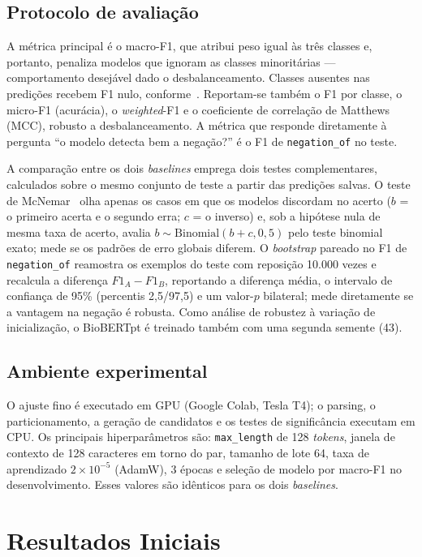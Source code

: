\documentclass[12pt]{article}
\begin{document}
\subsection{Protocolo de avaliação}
A métrica principal é o macro-F1, que atribui peso igual às três classes e,
portanto, penaliza modelos que ignoram as classes minoritárias --- comportamento
desejável dado o desbalanceamento. Classes ausentes nas predições recebem F1
nulo, conforme~\cite{forman:10}. Reportam-se também o F1 por classe, o micro-F1
(acurácia), o \emph{weighted}-F1 e o coeficiente de correlação de Matthews
(MCC), robusto a desbalanceamento. A métrica que responde diretamente à pergunta
``o modelo detecta bem a negação?'' é o F1 de \texttt{negation\_of} no teste.

A comparação entre os dois \emph{baselines} emprega dois testes complementares,
calculados sobre o mesmo conjunto de teste a partir das predições salvas. O teste
de McNemar~\cite{dietterich:98} olha apenas os casos em que os modelos discordam
no acerto ($b$ = o primeiro acerta e o segundo erra; $c$ = o inverso) e, sob a
hipótese nula de mesma taxa de acerto, avalia $b \sim \mathrm{Binomial}(b+c,
0{,}5)$ pelo teste binomial exato; mede se os padrões de erro globais diferem.
O \emph{bootstrap} pareado no F1 de \texttt{negation\_of} reamostra os exemplos
do teste com reposição 10.000 vezes e recalcula a diferença $F1_A - F1_B$,
reportando a diferença média, o intervalo de confiança de 95\% (percentis
2,5/97,5) e um valor-$p$ bilateral; mede diretamente se a vantagem na negação é
robusta. Como análise de robustez à variação de inicialização, o BioBERTpt é
treinado também com uma segunda semente (43).

\subsection{Ambiente experimental}
O ajuste fino é executado em GPU (Google Colab, Tesla T4); o parsing, o
particionamento, a geração de candidatos e os testes de significância executam em
CPU. Os principais hiperparâmetros são: \texttt{max\_length} de 128
\emph{tokens}, janela de contexto de 128 caracteres em torno do par, tamanho de
lote 64, taxa de aprendizado $2\times10^{-5}$ (AdamW), 3 épocas e seleção de
modelo por macro-F1 no desenvolvimento. Esses valores são idênticos para os dois
\emph{baselines}.

\section{Resultados Iniciais}\label{sec:res}
\end{document}
